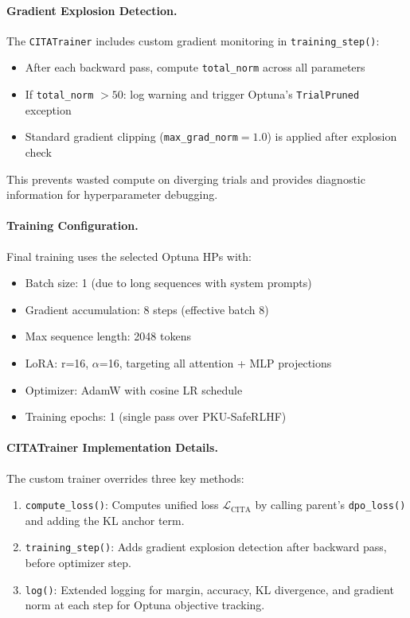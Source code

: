 \paragraph{Gradient Explosion Detection.} The \texttt{CITATrainer} includes custom gradient monitoring in \texttt{training\_step()}:
\begin{itemize}[leftmargin=*]
    \item After each backward pass, compute \texttt{total\_norm} across all parameters
    \item If \texttt{total\_norm} $> 50$: log warning and trigger Optuna's \texttt{TrialPruned} exception
    \item Standard gradient clipping (\texttt{max\_grad\_norm}$=1.0$) is applied after explosion check
\end{itemize}

This prevents wasted compute on diverging trials and provides diagnostic information for hyperparameter debugging.

\paragraph{Training Configuration.} Final training uses the selected Optuna HPs with:
\begin{itemize}[leftmargin=*]
    \item Batch size: 1 (due to long sequences with system prompts)
    \item Gradient accumulation: 8 steps (effective batch 8)
    \item Max sequence length: 2048 tokens
    \item LoRA: r=16, $\alpha$=16, targeting all attention + MLP projections
    \item Optimizer: AdamW with cosine LR schedule
    \item Training epochs: 1 (single pass over PKU-SafeRLHF)
\end{itemize}

\paragraph{CITATrainer Implementation Details.} The custom trainer overrides three key methods:

\begin{enumerate}[leftmargin=*]
    \item \texttt{compute\_loss()}: Computes unified loss $\mathcal{L}_{\text{CITA}}$ by calling parent's \texttt{dpo\_loss()} and adding the KL anchor term.

    \item \texttt{training\_step()}: Adds gradient explosion detection after backward pass, before optimizer step.

    \item \texttt{log()}: Extended logging for margin, accuracy, KL divergence, and gradient norm at each step for Optuna objective tracking.
\end{enumerate}

